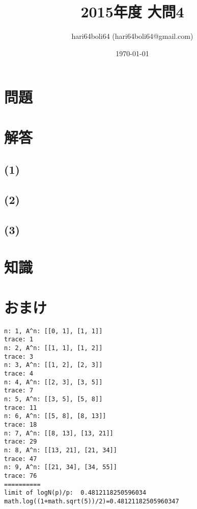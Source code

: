\documentclass[a4paper, 10pt, dvipdfmx]{jlreq}
\begin{document}
\title{2015年度 大問4}
\author{hari64boli64 (hari64boli64@gmail.com)}
\date{\today}
\maketitle

\section{問題}

\section{解答}

\subsection*{(1)}

\subsection*{(2)}

\subsection*{(3)}

\section{知識}


\section{おまけ}



\begin{lstlisting}[caption=result, label=code:result]
n: 1, A^n: [[0, 1], [1, 1]]
trace: 1
n: 2, A^n: [[1, 1], [1, 2]]
trace: 3
n: 3, A^n: [[1, 2], [2, 3]]
trace: 4
n: 4, A^n: [[2, 3], [3, 5]]
trace: 7
n: 5, A^n: [[3, 5], [5, 8]]
trace: 11
n: 6, A^n: [[5, 8], [8, 13]]
trace: 18
n: 7, A^n: [[8, 13], [13, 21]]
trace: 29
n: 8, A^n: [[13, 21], [21, 34]]
trace: 47
n: 9, A^n: [[21, 34], [34, 55]]
trace: 76
==========
limit of logN(p)/p:  0.4812118250596034
math.log((1+math.sqrt(5))/2)=0.48121182505960347
\end{lstlisting}

\begin{thebibliography}{9}

\end{thebibliography}
\end{document}
